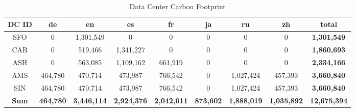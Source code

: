 \begin{table}[h]
  
  
  \begin{small}
  \centering
  \begin{tabular}{|c| c c c c c c c | c| }
    \hline
    \bf{DC ID} & \bf{de} & \bf{en}    & \bf{es} & \bf{fr} & \bf{ja} & \bf{ru} & \bf{zh} & \bf{total}\\
    \hline
    SFO        & 0       & 1,301,549  & 0       & 0 & 0 & 0 & 0 & \bf{1,301,549}\\
    CAR        & 0       & 519,466    & 1,341,227  & 0 & 0 & 0 & 0 & \bf{1,860,693}\\
    ASH        & 0       & 563,085    & 1,109,162  & 661,919 & 0 & 0 & 0 & \bf{2,334,166}\\
    AMS       & 464,780      & 470,714   & 473,987  & 766,542 & 0 & 1,027,424 & 457,393 & \bf{3,660,840}\\
    SIN &  464,780      & 470,714   & 473,987  & 766,542 & 0 & 1,027,424 & 457,393 & \bf{3,660,840}\\
    \hline
    \bf{Sum} & \bf{464,780} & \bf{3,446,114}    & \bf{2,924,376} & \bf{2,042,611} & \bf{873,602} & \bf{1,888,019} & \bf{1,035,892} & \bf{12,675,394}\\
    \hline
  \end{tabular}

  \caption{Data Center Carbon Footprint}
  \label{table:dc_carbon_footprint}
  \end{small}
  \end{table}